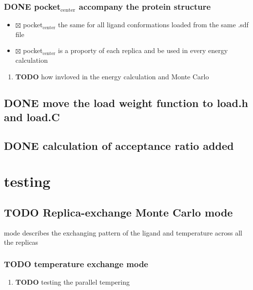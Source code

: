 \documentclass[11pt]{article}
\begin{document}
\subsubsection{{\bfseries\sffamily DONE} pocket$_{\text{center}}$ accompany the protein structure}
\label{sec-2-2-4}
\begin{itemize}
\item $\boxtimes$ pocket$_{\text{center}}$ the same for all ligand conformations loaded from the same .sdf file
\item $\boxtimes$ pocket$_{\text{center}}$ is a proporty of each replica and be used in every energy calculation
\end{itemize}

\begin{enumerate}
\item {\bfseries\sffamily TODO} how invloved in the energy calculation and Monte Carlo
\label{sec-2-2-4-1}
\end{enumerate}
\subsection{{\bfseries\sffamily DONE} move the load weight function to load.h and load.C}
\label{sec-2-3}
\subsection{{\bfseries\sffamily DONE} calculation of acceptance ratio added}
\label{sec-2-4}

\section{testing}
\label{sec-3}


\subsection{{\bfseries\sffamily TODO} Replica-exchange Monte Carlo mode}
\label{sec-3-1}
mode describes the exchanging pattern of the ligand and temperature across all the replicas
\subsubsection{{\bfseries\sffamily TODO} temperature exchange mode}
\label{sec-3-1-1}
\begin{enumerate}
\item {\bfseries\sffamily TODO} testing the parallel tempering
\label{sec-3-1-1-1}
\end{enumerate}
\end{document}
